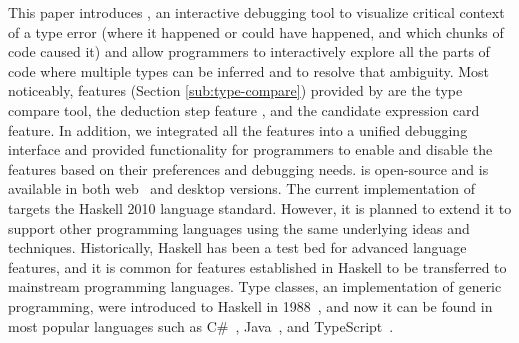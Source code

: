 This paper introduces \chameleon{}, an interactive debugging tool to visualize critical context of a type error (where it happened or could have happened, and which chunks of code caused it) and allow programmers to interactively explore all the parts of code where multiple types can be inferred and to resolve that ambiguity. Most noticeably, features (Section \ref{sub:type-compare}) provided by \chameleon{} are the type compare tool, the deduction step feature , and the candidate expression card feature.  In addition, we integrated all the features into a unified debugging interface and provided functionality for programmers to enable and disable the features based on their preferences and debugging needs. \chameleon{} is open-source and is available in both web~\cite{chameleon} and desktop versions. The current implementation of \chameleon{} targets the Haskell 2010 language standard. However, it is planned to extend it to support other programming languages using the same underlying ideas and techniques. Historically, Haskell has been a test bed for advanced language features, and it is common for features established in Haskell to be transferred to mainstream programming languages. Type classes, an implementation of generic programming, were introduced to Haskell in 1988~\cite{hudak2007history}, and now it can be found in most popular languages such as C\#~\cite{csharpgenerics}, Java~\cite{javagenerics}, and TypeScript~\cite{tsgenerics}.




